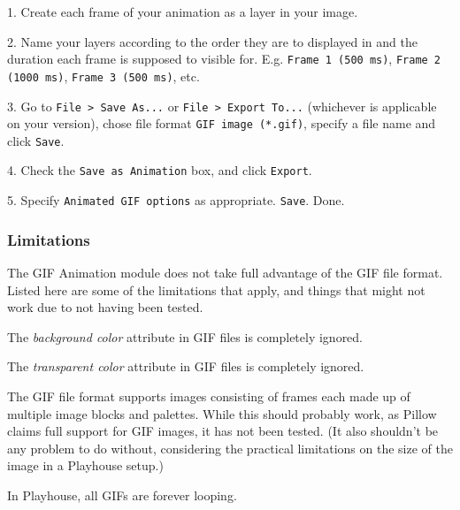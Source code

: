 1. Create each frame of your animation as a layer in your image.

2. Name your layers according to the order they are to displayed in and the duration
   each frame is supposed to visible for. E.g. \texttt{Frame 1 (500 ms)}, \texttt{Frame 2 (1000 ms)}, \texttt{Frame 3 (500 ms)}, etc.

3. Go to \texttt{File > Save As...} or \texttt{File > Export To...} (whichever is applicable on your
   version), chose file format \texttt{GIF image (*.gif)}, specify a file name and click \texttt{Save}.

4. Check the \texttt{Save as Animation} box, and click \texttt{Export}.

5. Specify \texttt{Animated GIF options} as appropriate. \texttt{Save}. Done.


\subsubsection{Limitations}

The GIF Animation module does not take full advantage of the GIF file format.
Listed here are some of the limitations that apply, and things that might not
work due to not having been tested.

The \textit{background color} attribute in GIF files is completely ignored.

The \textit{transparent color} attribute in GIF files is completely ignored.

The GIF file format supports images consisting of frames each made up of
  multiple image blocks and palettes. While this should probably work, as
  Pillow claims full support for GIF images, it has not been tested. (It
  also shouldn't be any problem to do without, considering the practical
  limitations on the size of the image in a Playhouse setup.)

In Playhouse, all GIFs are forever looping.
